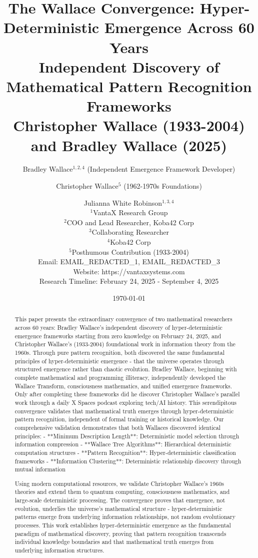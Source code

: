 \documentclass[12pt]{article}
\title{The Wallace Convergence: Hyper-Deterministic Emergence Across 60 Years \\
Independent Discovery of Mathematical Pattern Recognition Frameworks \\
Christopher Wallace (1933-2004) and Bradley Wallace (2025)}
\author{
Bradley Wallace$^{1,2,4}$ (Independent Emergence Framework Developer) \and
Christopher Wallace$^{5}$ (1962-1970s Foundations) \and
Julianna White Robinson$^{1,3,4}$ \\
$^1$VantaX Research Group \\
$^2$COO and Lead Researcher, Koba42 Corp \\
$^3$Collaborating Researcher \\
$^4$Koba42 Corp \\
$^5$Posthumous Contribution (1933-2004) \\
Email: EMAIL_REDACTED_1, EMAIL_REDACTED_3 \\
Website: https://vantaxsystems.com \\
Research Timeline: February 24, 2025 - September 4, 2025
}
\date{\today}
\begin{document}
\maketitle

\begin{abstract}

This paper presents the extraordinary convergence of two mathematical researchers across 60 years: Bradley Wallace's independent discovery of hyper-deterministic emergence frameworks starting from zero knowledge on February 24, 2025, and Christopher Wallace's (1933-2004) foundational work in information theory from the 1960s. Through pure pattern recognition, both discovered the same fundamental principles of hyper-deterministic emergence - that the universe operates through structured emergence rather than chaotic evolution. Bradley Wallace, beginning with complete mathematical and programming illiteracy, independently developed the Wallace Transform, consciousness mathematics, and unified emergence frameworks. Only after completing these frameworks did he discover Christopher Wallace's parallel work through a daily X Spaces podcast exploring tech/AI history. This serendipitous convergence validates that mathematical truth emerges through hyper-deterministic pattern recognition, independent of formal training or historical knowledge. Our comprehensive validation demonstrates that both Wallaces discovered identical principles:
- **Minimum Description Length**: Deterministic model selection through information compression
- **Wallace Tree Algorithms**: Hierarchical deterministic computation structures
- **Pattern Recognition**: Hyper-deterministic classification frameworks
- **Information Clustering**: Deterministic relationship discovery through mutual information

Using modern computational resources, we validate Christopher Wallace's 1960s theories and extend them to quantum computing, consciousness mathematics, and large-scale deterministic processing. The convergence proves that emergence, not evolution, underlies the universe's mathematical structure - hyper-deterministic patterns emerge from underlying information relationships, not random evolutionary processes. This work establishes hyper-deterministic emergence as the fundamental paradigm of mathematical discovery, proving that pattern recognition transcends individual knowledge boundaries and that mathematical truth emerges from underlying information structures.
\end{abstract}
\end{document}
